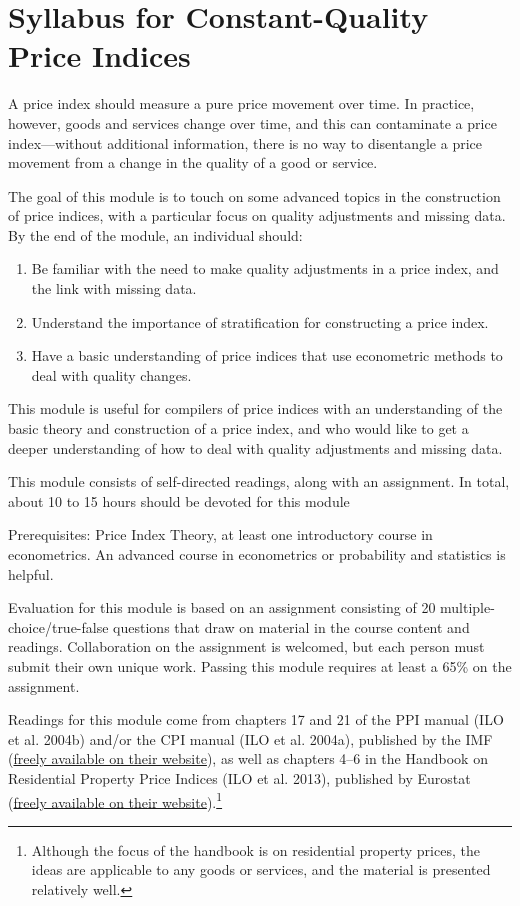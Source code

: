 \documentclass[
]{article}
\begin{document}
\hypertarget{syllabus-for-constant-quality-price-indices}{%
\section{Syllabus for Constant-Quality Price Indices}\label{syllabus-for-constant-quality-price-indices}}

A price index should measure a pure price movement over time. In practice, however, goods and services change over time, and this can contaminate a price index---without additional information, there is no way to disentangle a price movement from a change in the quality of a good or service.

The goal of this module is to touch on some advanced topics in the construction of price indices, with a particular focus on quality adjustments and missing data. By the end of the module, an individual should:

\begin{enumerate}
\def\labelenumi{\arabic{enumi}.}
\item
  Be familiar with the need to make quality adjustments in a price index, and the link with missing data.
\item
  Understand the importance of stratification for constructing a price index.
\item
  Have a basic understanding of price indices that use econometric methods to deal with quality changes.
\end{enumerate}

This module is useful for compilers of price indices with an understanding of the basic theory and construction of a price index, and who would like to get a deeper understanding of how to deal with quality adjustments and missing data.

This module consists of self-directed readings, along with an assignment. In total, about 10 to 15 hours should be devoted for this module

Prerequisites: Price Index Theory, at least one introductory course in econometrics. An advanced course in econometrics or probability and statistics is helpful.

Evaluation for this module is based on an assignment consisting of 20 multiple-choice/true-false questions that draw on material in the course content and readings. Collaboration on the assignment is welcomed, but each person must submit their own unique work. Passing this module requires at least a 65\% on the assignment.

Readings for this module come from chapters 17 and 21 of the PPI manual (ILO et al. 2004b) and/or the CPI manual (ILO et al. 2004a), published by the IMF (\href{https://www.imf.org/en/Publications/Manuals-Guides/Issues/2016/12/30/Producer-Price-Index-Manual-Theory-and-Practice-16966}{freely available on their website}), as well as chapters 4--6 in the Handbook on Residential Property Price Indices (ILO et al. 2013), published by Eurostat (\href{https://ec.europa.eu/eurostat/web/products-manuals-and-guidelines/-/KS-RA-12-022}{freely available on their website}).\footnote{Although the focus of the handbook is on residential property prices, the ideas are applicable to any goods or services, and the material is presented relatively well.}
\end{document}
